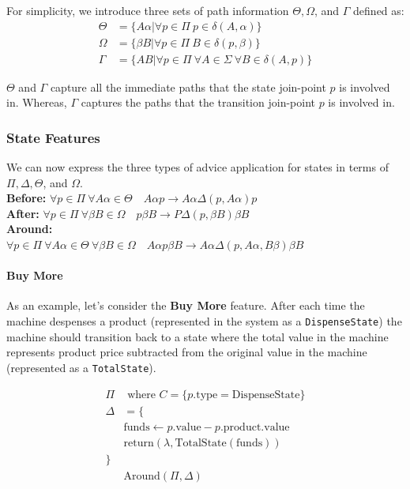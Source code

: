 \documentclass[sigplan,anonymous,review]{acmart}
\begin{document}
For simplicity, we introduce three sets of path information $\Theta, \Omega$, and $\Gamma$ defined as:
\begin{align*}
    \Theta &= \{A \alpha | \forall p \in \Pi \ p \in \delta(A, \alpha)\}\\
    \Omega &= \{\beta B | \forall p \in \Pi \ B \in \delta(p, \beta)\}\\
    \Gamma &= \{AB | \forall p \in \Pi \ \forall A \in \Sigma \ \forall B \in \delta(A, p)\}
\end{align*}

$\Theta$ and $\Gamma$ capture all the immediate paths that the state join-point $p$ is involved in. Whereas, $\Gamma$ captures the paths that the transition join-point $p$ is involved in. 

\subsubsection{State Features}
We can now express the three types of advice application for states in terms of $\Pi, \Delta, \Theta$, and $\Omega$.\\
\textbf{Before:} $\forall p \in \Pi \ \forall A \alpha \in \Theta \quad A \alpha p \rightarrow A \alpha \Delta(p, A \alpha)p$\\
\textbf{After:} $\forall p \in \Pi \ \forall \beta B \in \Omega \quad p\beta B \rightarrow P\Delta(p, \beta B)\beta B$\\
\textbf{Around:} \\
$\forall p \in \Pi \ \forall A \alpha \in \Theta \ \forall \beta B \in \Omega \quad A \alpha p \beta B \rightarrow A \alpha \Delta(p, A \alpha, B \beta) \beta B $
\paragraph{Buy More} As an example, let's consider the \textbf{Buy More} feature. After each time the machine despenses a product (represented in the system as a \texttt{DispenseState}) the machine should transition back to a state where the total value in the machine represents product price subtracted from the original value in the machine (represented as a \texttt{TotalState}).

\begin{align*}
    \Pi & \text{ where } C = \{p.\mathrm{type} = \mathrm{DispenseState}\}\\
    \Delta &= \{\\
    &\mathrm{funds} \leftarrow p.\mathrm{value} - p.\mathrm{product.value}\\
    &\mathrm{return} (\lambda, \mathrm{TotalState(funds)})\\
    \}\\
    &\mathrm{Around}(\Pi, \Delta)
\end{align*}
\end{document}
